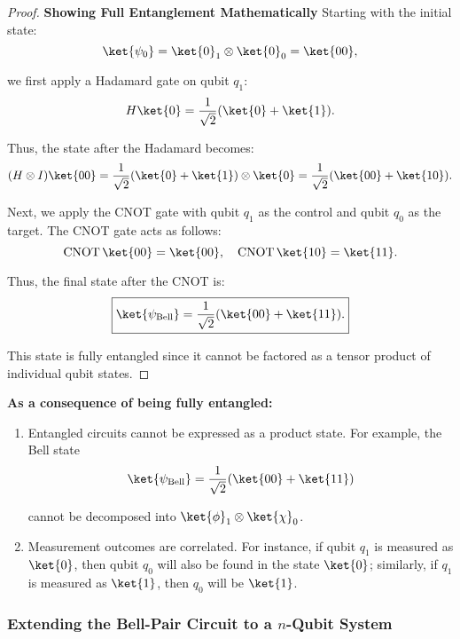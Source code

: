 \begin{proof}{\textbf{Showing Full Entanglement Mathematically}}
  Starting with the initial state:
  \[
    \ket{\psi_0} = \ket{0}_1 \otimes \ket{0}_0 = \ket{00},
  \]

  we first apply a Hadamard gate on qubit \(q_1\):
  \[
    H\ket{0} = \frac{1}{\sqrt{2}}(\ket{0} + \ket{1}).
  \]

  Thus, the state after the Hadamard becomes:
  \[
    (H \otimes I)\ket{00} = \frac{1}{\sqrt{2}}(\ket{0} + \ket{1}) \otimes
    \ket{0} = \frac{1}{\sqrt{2}}(\ket{00} + \ket{10}).
  \]

  Next, we apply the CNOT gate with qubit \(q_1\) as the control and qubit
  \(q_0\) as the target. The CNOT gate acts as follows:
  \[
    \text{CNOT}\,\ket{00} = \ket{00}, \quad \text{CNOT}\,\ket{10} = \ket{11}.
  \]

  Thus, the final state after the CNOT is:
  \[
    \boxed{
      \ket{\psi_{\text{Bell}}} = \frac{1}{\sqrt{2}}(\ket{00} + \ket{11}).
    }
  \]

  This state is fully entangled since it cannot be factored as a tensor
  product of individual qubit states.

\end{proof}

\vspace{0.3cm}

\noindent
\textbf{
  As a consequence of being fully entangled:
}

\begin{enumerate}
  \item Entangled circuits cannot be expressed as a product state. For
    example, the Bell state
    \[
      \ket{\psi_{\text{Bell}}} = \frac{1}{\sqrt{2}}(\ket{00} + \ket{11})
    \]

    cannot be decomposed into \(\ket{\phi}_1 \otimes \ket{\chi}_0\).

  \item Measurement outcomes are correlated. For instance, if qubit \(q_1\)
    is measured as \(\ket{0}\), then qubit \(q_0\) will also be found in the
    state \(\ket{0}\); similarly, if \(q_1\) is measured as \(\ket{1}\), then
    \(q_0\) will be \(\ket{1}\).

\end{enumerate}


\subsubsection*{Extending the Bell-Pair Circuit to a $n$-Qubit System}

